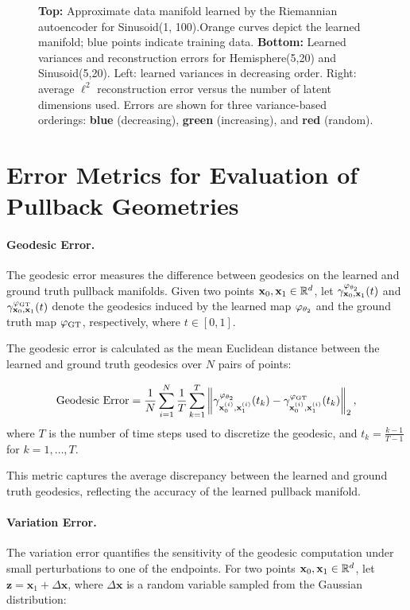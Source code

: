 \begin{figure}[htbp]
    \caption{
    \textbf{Top:} Approximate data manifold learned by the Riemannian autoencoder for Sinusoid(1, 100).Orange curves depict the learned manifold; blue points indicate training data.
    \textbf{Bottom:} Learned variances and reconstruction errors for Hemisphere(5,20) and Sinusoid(5,20). Left: learned variances in decreasing order. Right: average $\ell^2$ reconstruction error versus the number of latent dimensions used. Errors are shown for three variance-based orderings: \textbf{blue} (decreasing), \textbf{green} (increasing), and \textbf{red} (random).}
    \label{fig:rae_appendix_combined}
\end{figure}

\clearpage
\section{Error Metrics for Evaluation of Pullback Geometries}
\label{app:Error metrics for evaluation of Pullback Geometries}

\paragraph{Geodesic Error.}
The geodesic error measures the difference between geodesics on the learned and ground truth pullback manifolds. Given two points \(\mathbf{x}_0, \mathbf{x}_1 \in \mathbb{R}^{d}\), let \(\gamma_{\mathbf{x}_0, \mathbf{x}_1}^{\varphi_{\theta_2}}(t)\) and \(\gamma_{\mathbf{x}_0, \mathbf{x}_1}^{\varphi_{\mathrm{GT}}}(t)\) denote the geodesics induced by the learned map \(\varphi_{\theta_2}\) and the ground truth map \(\varphi_{\mathrm{GT}}\), respectively, where \(t \in [0, 1]\).

The geodesic error is calculated as the mean Euclidean distance between the learned and ground truth geodesics over \(N\) pairs of points:

\[
\text{Geodesic Error} = \frac{1}{N} \sum_{i=1}^{N} \frac{1}{T} \sum_{k=1}^{T} \left\| \gamma_{\mathbf{x}_0^{(i)}, \mathbf{x}_1^{(i)}}^{\varphi_{\theta_2}}(t_k) - \gamma_{\mathbf{x}_0^{(i)}, \mathbf{x}_1^{(i)}}^{\varphi_{\mathrm{GT}}}(t_k) \right\|_2,
\]
where \(T\) is the number of time steps used to discretize the geodesic, and \(t_k = \frac{k-1}{T-1}\) for \(k = 1, \dots, T\).

This metric captures the average discrepancy between the learned and ground truth geodesics, reflecting the accuracy of the learned pullback manifold.

\paragraph{Variation Error.}
The variation error quantifies the sensitivity of the geodesic computation under small perturbations to one of the endpoints. For two points \(\mathbf{x}_0, \mathbf{x}_1 \in \mathbb{R}^{d}\), let \(\mathbf{z} = \mathbf{x}_1 + \Delta\mathbf{x}\), where \(\Delta\mathbf{x}\) is a random variable sampled from the Gaussian distribution:

